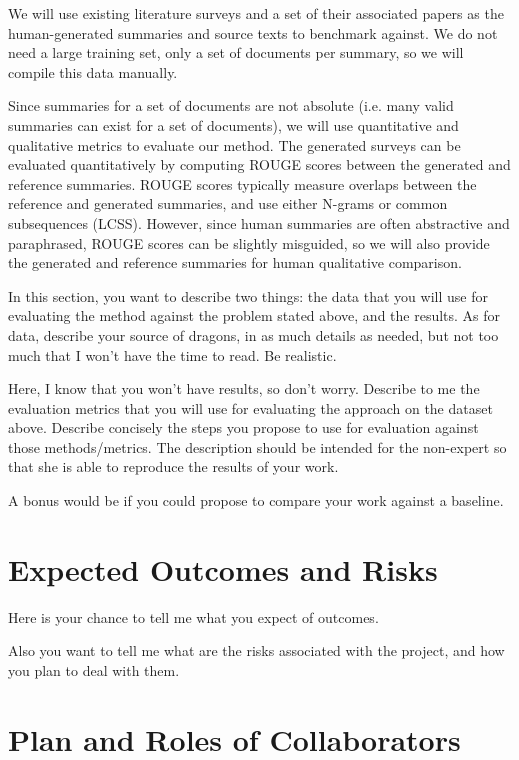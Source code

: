 \documentclass[conference]{sig-alternate-05-2015}
\begin{document}
We will use existing literature surveys and a set of their associated papers as the human-generated 
summaries and source texts to benchmark against. We do not need a large training set, only a set of documents per summary, 
so we will compile this data manually.

Since summaries for a set of documents are not absolute (i.e. many valid summaries can exist for a set of documents), 
we will use quantitative and qualitative metrics to evaluate our method. The generated surveys can be evaluated quantitatively 
by computing ROUGE \cite{rouge} scores between the generated and reference summaries. ROUGE scores typically measure 
overlaps between the reference and generated summaries, and use either N-grams or common subsequences (LCSS). However, 
since human summaries are often abstractive and paraphrased, ROUGE scores can be slightly misguided, so we will also 
provide the generated and reference summaries for human qualitative comparison.

In this section, you want to describe two things: the data that you will use for evaluating the method against the problem stated above, and the results. As for data, describe your source of dragons, in as much details as needed, but not too much that I won't have the time to read. Be realistic. 

Here, I know that you won't have results, so don't worry. Describe to me the evaluation metrics that you will use for evaluating the approach on the dataset above. Describe concisely the steps you propose to use for evaluation against those methods/metrics. The description should be intended for the non-expert so that she is able to reproduce the results of your work. 

A bonus would be if you could propose to compare your work against a baseline. 

\section{Expected Outcomes and Risks}

Here is your chance to tell me what you expect of outcomes. 

Also you want to tell me what are the risks associated with the project, and how you plan to deal with them. 

\section{Plan and Roles of Collaborators}
\end{document}
